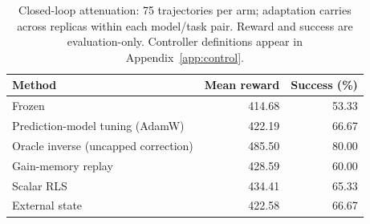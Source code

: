 \begin{table}[tbp]
\centering\small
\caption{Closed-loop attenuation: 75 trajectories per arm; adaptation carries across replicas within each model/task pair. Reward and success are evaluation-only. Controller definitions appear in Appendix~\ref{app:control}.}
\label{tab:control}
\begin{tabular}{@{}lrr@{}}
\toprule
Method & Mean reward & Success (\%) \\
\midrule
Frozen & 414.68 & 53.33 \\
Prediction-model tuning (AdamW) & 422.19 & 66.67 \\
Oracle inverse (uncapped correction) & 485.50 & 80.00 \\
Gain-memory replay & 428.59 & 60.00 \\
Scalar RLS & 434.41 & 65.33 \\
External state & 422.58 & 66.67 \\
\bottomrule
\end{tabular}
\end{table}
